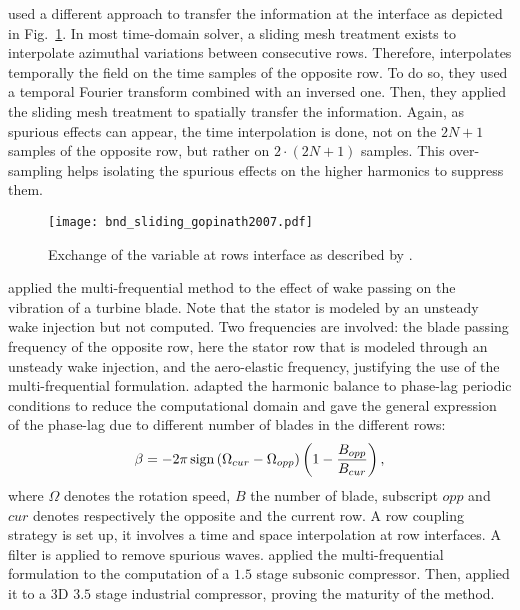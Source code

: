 \citet{Gopinath2007} used a different approach to transfer
the information at the interface as depicted
in Fig.~\ref{fig:bnd_sliding_gopinath2007}. In most time-domain solver,
a sliding mesh treatment exists to interpolate azimuthal variations
between consecutive rows. Therefore, \citet{Gopinath2007}
interpolates temporally the field on the time samples
of the opposite row. To do so, they used a temporal Fourier
transform combined with an inversed one.
Then, they applied the sliding mesh treatment
to spatially transfer the information. Again, as spurious effects
can appear, the time interpolation is done, not on the $2N+1$ samples
of the opposite row, but rather on $2\cdot (2N+1)$ samples. This over-sampling
helps isolating the spurious effects on the higher harmonics to suppress them.
\begin{figure}[htbp]
  \centering
  \texttt{[image: bnd\_sliding\_gopinath2007.pdf]}
  \caption{Exchange of the variable at rows interface as described by \citet{Gopinath2007}.}
  \label{fig:bnd_sliding_gopinath2007}
\end{figure}
\citet{Ekici2008a} applied the multi-frequential method
to the effect of wake passing on the vibration of
a turbine blade. Note that the stator is modeled
by an unsteady wake injection but not computed.
Two frequencies are involved: the blade passing
frequency of the opposite row, here the
stator row that is modeled through an unsteady wake injection,
and the aero-elastic frequency, justifying the use
of the multi-frequential formulation.
\citet{JSicot2012} adapted the harmonic balance 
to phase-lag periodic 
conditions to reduce the computational domain
and gave the general expression of the phase-lag due to
different number of blades in the different rows:
\begin{equation}
 	\beta = - 2 \pi \operatorname{sign} \left(\Omega_{cur} - \Omega_{opp} \right) 
 	\left(1 - \frac{B_{opp}}{B_{cur}}\right),
\end{equation} 
where $\Omega$ denotes the rotation speed, $B$ the number
of blade, subscript $opp$ and $cur$ denotes respectively the
opposite and the current row.
A row coupling strategy is set up, it involves 
a time and space interpolation at row interfaces.
A filter is applied to remove spurious waves.
\citet{JGuedeney2013} applied the multi-frequential
formulation to the computation of a $1.5$ stage subsonic
compressor.
Then, \citet{JSicot2013} applied it to a $3$D
$3.5$ stage industrial compressor, proving the maturity of
the method.

